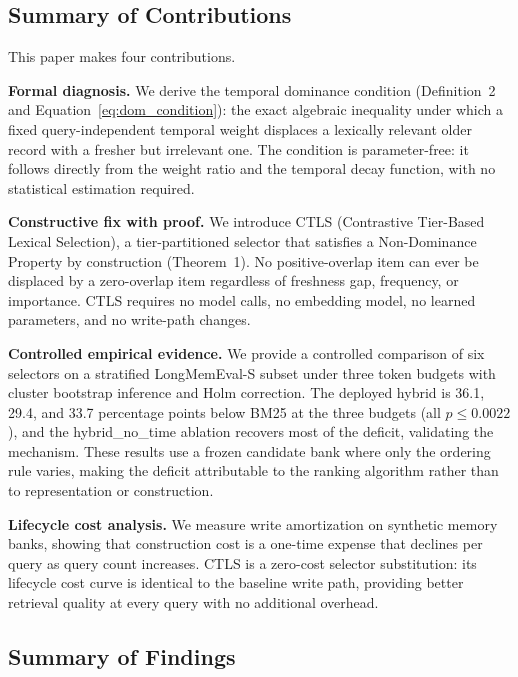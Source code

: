 \subsection{Summary of Contributions}

\label{sec:contributions}

This paper makes four contributions.

\textbf{Formal diagnosis.} We derive the temporal dominance condition (Definition~2 and Equation~\ref{eq:dom_condition}): the exact algebraic inequality under which a fixed query-independent temporal weight displaces a lexically relevant older record with a fresher but irrelevant one. The condition is parameter-free: it follows directly from the weight ratio and the temporal decay function, with no statistical estimation required.

\textbf{Constructive fix with proof.} We introduce CTLS (Contrastive Tier-Based Lexical Selection), a tier-partitioned selector that satisfies a Non-Dominance Property by construction (Theorem~1). No positive-overlap item can ever be displaced by a zero-overlap item regardless of freshness gap, frequency, or importance. CTLS requires no model calls, no embedding model, no learned parameters, and no write-path changes.

\textbf{Controlled empirical evidence.} We provide a controlled comparison of six selectors on a stratified LongMemEval-S subset under three token budgets with cluster bootstrap inference and Holm correction. The deployed hybrid is 36.1, 29.4, and 33.7 percentage points below BM25 at the three budgets (all $p \le 0.0022$), and the hybrid\_no\_time ablation recovers most of the deficit, validating the mechanism. These results use a frozen candidate bank where only the ordering rule varies, making the deficit attributable to the ranking algorithm rather than to representation or construction.

\textbf{Lifecycle cost analysis.} We measure write amortization on synthetic memory banks, showing that construction cost is a one-time expense that declines per query as query count increases. CTLS is a zero-cost selector substitution: its lifecycle cost curve is identical to the baseline write path, providing better retrieval quality at every query with no additional overhead.

\subsection{Summary of Findings}

